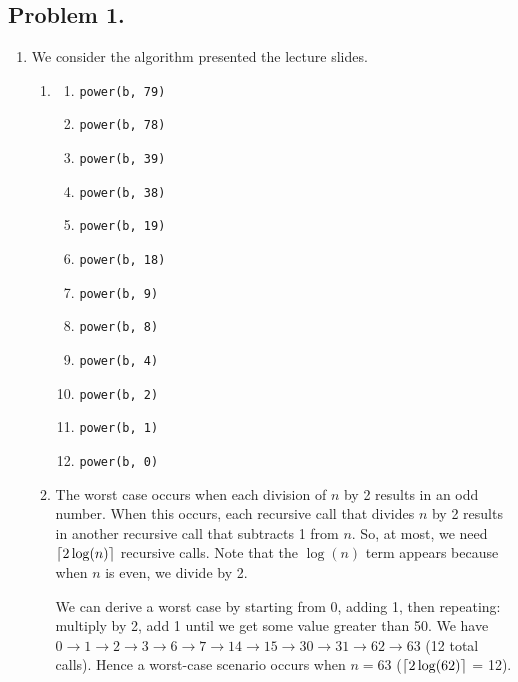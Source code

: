 \documentclass[11pt, letterpaper, titlepage]{article}
\DeclarePairedDelimiter\ceil{\lceil}{\rceil}
\begin{document}
\onehalfspacing

\subsection*{Problem 1.}
\begin{enumerate}[label=\alph*.]
    \item We consider the algorithm presented the lecture slides.
    \begin{enumerate}[label=(\roman*)]
        \item 
        \begin{enumerate}[label=\arabic*.]
            \item \texttt{power(b, 79)}
            \item \texttt{power(b, 78)}
            \item \texttt{power(b, 39)}
            \item \texttt{power(b, 38)}
            \item \texttt{power(b, 19)}
            \item \texttt{power(b, 18)}
            \item \texttt{power(b, 9)}
            \item \texttt{power(b, 8)}
            \item \texttt{power(b, 4)}
            \item \texttt{power(b, 2)}
            \item \texttt{power(b, 1)}
            \item \texttt{power(b, 0)}
        \end{enumerate}

        \item The worst case occurs when each division of $n$ by 2 results in an odd number. When this occurs, each recursive call that divides $n$ by 2 results in another recursive call that subtracts 1 from $n$. So, at most, we need $\ceil*{2\log(n)}$ recursive calls. Note that the $\log(n)$ term appears because when $n$ is even, we divide by 2.
        
        We can derive a worst case by starting from 0, adding 1, then repeating: multiply by 2, add 1 until we get some value greater than 50. We have $0 \rightarrow 1 \rightarrow 2 \rightarrow 3 \rightarrow 6 \rightarrow 7 \rightarrow 14 \rightarrow 15 \rightarrow 30 \rightarrow 31 \rightarrow 62 \rightarrow 63$ (12 total calls). Hence a worst-case scenario occurs when $n = 63$ ($\ceil*{2\log(62)}$ = 12).
    \end{enumerate}


\end{enumerate}
\end{document}
